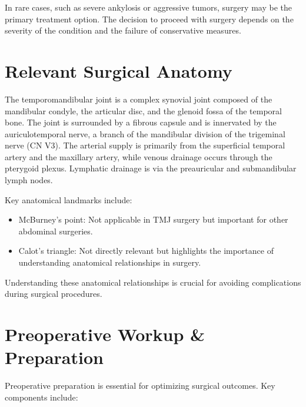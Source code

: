 In rare cases, such as severe ankylosis or aggressive tumors, surgery may be the primary treatment option. The decision to proceed with surgery depends on the severity of the condition and the failure of conservative measures.

\section*{Relevant Surgical Anatomy}
The temporomandibular joint is a complex synovial joint composed of the mandibular condyle, the articular disc, and the glenoid fossa of the temporal bone. The joint is surrounded by a fibrous capsule and is innervated by the auriculotemporal nerve, a branch of the mandibular division of the trigeminal nerve (CN V3). The arterial supply is primarily from the superficial temporal artery and the maxillary artery, while venous drainage occurs through the pterygoid plexus. Lymphatic drainage is via the preauricular and submandibular lymph nodes.

Key anatomical landmarks include:

\begin{itemize}
  \item McBurney's point: Not applicable in TMJ surgery but important for other abdominal surgeries.
  \item Calot's triangle: Not directly relevant but highlights the importance of understanding anatomical relationships in surgery.
\end{itemize}

Understanding these anatomical relationships is crucial for avoiding complications during surgical procedures.

\section*{Preoperative Workup \& Preparation}
Preoperative preparation is essential for optimizing surgical outcomes. Key components include:

